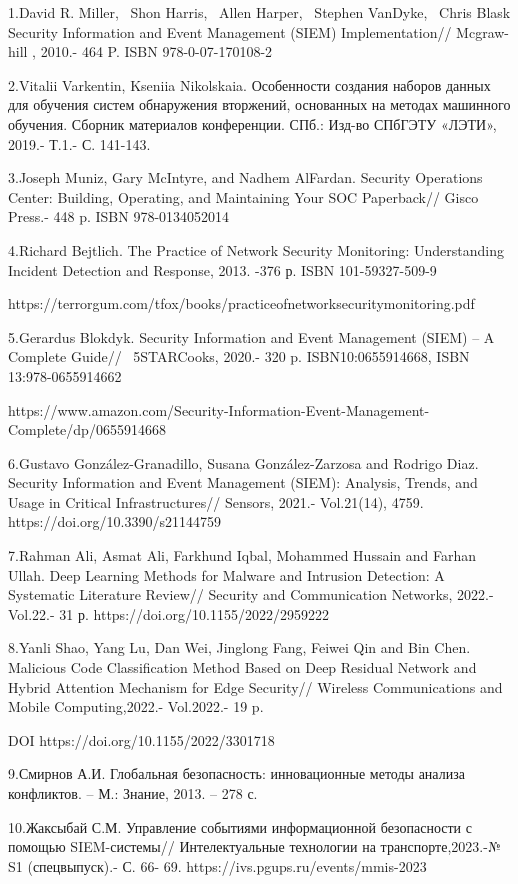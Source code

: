 \begin{noparindent}
1.David R. Miller,~ Shon Harris,~ Allen Harper,~ Stephen VanDyke,~ Chris
Blask Security Information and Event Management (SIEM) Implementation//
Mcgraw-hill , 2010.- 464 P. ISBN 978-0-07-170108-2

2.Vitalii Varkentin, Kseniia Nikolskaia. Особенности создания наборов
данных для обучения систем обнаружения вторжений, основанных на методах
машинного обучения. Сборник материалов конференции. СПб.: Изд-во СПбГЭТУ
«ЛЭТИ», 2019.- Т.1.- С. 141-143.

3.Joseph Muniz, Gary McIntyre, and Nadhem AlFardan. Security Operations
Center: Building, Operating, and Maintaining Your SOC Paperback// Gisco
Press.- 448 p. ISBN 978-0134052014

4.Richard Bejtlich. The Practice of Network Security Monitoring:
Understanding Incident Detection and Response, 2013. -376 р. ISBN
101-59327-509-9

https://terrorgum.com/tfox/books/practiceofnetworksecuritymonitoring.pdf

5.Gerardus Blokdyk. Security Information and Event Management (SIEM) --
A Complete Guide// ~5STARCooks, 2020.- 320 p. ISBN10:0655914668, ISBN
13:978-0655914662

https://www.amazon.com/Security-Information-Event-Management-Complete/dp/0655914668

6.Gustavo González-Granadillo, Susana González-Zarzosa and Rodrigo Diaz.
Security Information and Event Management (SIEM): Analysis, Trends, and
Usage in Critical Infrastructures// Sensors, 2021.- Vol.21(14), 4759.
https://doi.org/10.3390/s21144759

7.Rahman Ali, Asmat Ali, Farkhund Iqbal, Mohammed Hussain and Farhan
Ullah. Deep Learning Methods for Malware and Intrusion Detection: A
Systematic Literature Review// Security and Communication Networks,
2022.- Vol.22.- 31 р. https://doi.org/10.1155/2022/2959222

8.Yanli Shao, Yang Lu, Dan Wei, Jinglong Fang, Feiwei Qin and Bin Chen.
Malicious Code Classification Method Based on Deep Residual Network and
Hybrid Attention Mechanism for Edge Security// Wireless Communications
and Mobile Computing,2022.- Vol.2022.- 19 p.

DOI https://doi.org/10.1155/2022/3301718

9.Смирнов А.И. Глобальная безопасность: инновационные методы анализа
конфликтов. -- М.: Знание, 2013. -- 278 с.

10.Жаксыбай С.М. Управление событиями информационной безопасности с
помощью SIEM-системы// Интелектуальные технологии на транспорте,2023.-№
S1 (спецвыпуск).- С. 66- 69. https://ivs.pgups.ru/events/mmis-2023
\end{noparindent}

